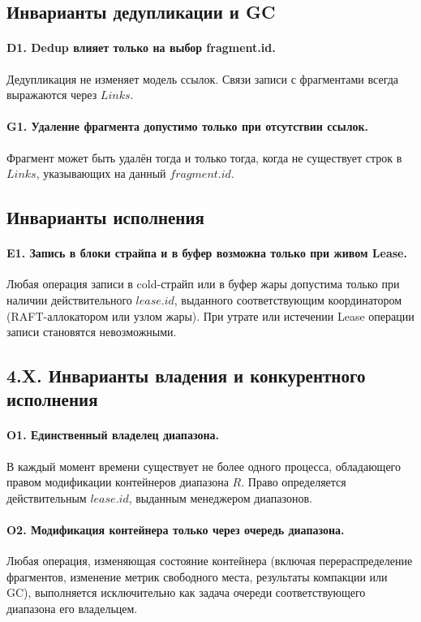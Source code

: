 \documentclass[a4paper,12pt]{article}
\begin{document}
\subsection{Инварианты дедупликации и GC}

\paragraph{D1. Dedup влияет только на выбор fragment.id.}
Дедупликация не изменяет модель ссылок. Связи записи с фрагментами
всегда выражаются через $Links$.

\paragraph{G1. Удаление фрагмента допустимо только при отсутствии ссылок.}
Фрагмент может быть удалён тогда и только тогда, когда не существует
строк в $Links$, указывающих на данный $fragment.id$.

\subsection{Инварианты исполнения}

\paragraph{E1. Запись в блоки страйпа и в буфер возможна только при живом Lease.}
Любая операция записи в cold-страйп или в буфер жары допустима только при наличии действительного $lease.id$, выданного соответствующим
координатором (RAFT-аллокатором или узлом жары). При утрате или истечении Lease операции записи становятся невозможными.

\subsection*{4.X. Инварианты владения и конкурентного исполнения}

\paragraph{O1. Единственный владелец диапазона.}
В каждый момент времени существует не более одного процесса,
обладающего правом модификации контейнеров диапазона $R$.
Право определяется действительным $lease.id$, выданным менеджером диапазонов.

\paragraph{O2. Модификация контейнера только через очередь диапазона.}
Любая операция, изменяющая состояние контейнера
(включая перераспределение фрагментов, изменение метрик свободного места,
результаты компакции или GC),
выполняется исключительно как задача очереди соответствующего диапазона
его владельцем.
\end{document}
